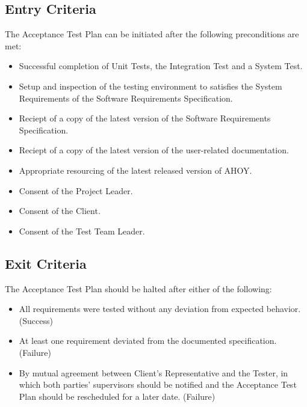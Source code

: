 \documentclass[titlepage]{article}
\begin{document}
\subsection{Entry Criteria}                                              
    The Acceptance Test Plan can be initiated after the following preconditions are met:
    \begin{itemize}
        \item Successful completion of Unit Tests, the Integration Test and a System Test.
        \item Setup and inspection of the testing environment to satisfies the System Requirements of the Software Requirements Specification.
        \item Reciept of a copy of the latest version of the Software Requirements Specification.
        \item Reciept of a copy of the latest version of the user-related documentation.
        \item Appropriate resourcing of the latest released version of AHOY.
        \item Consent of the Project Leader.
        \item Consent of the Client.
        \item Consent of the Test Team Leader.
    \end{itemize}


\subsection{Exit Criteria}
    The Acceptance Test Plan should be halted after either of the following:
    \begin{itemize}
        \item All requirements were tested without any deviation from expected behavior. (Success)
        \item At least one requirement deviated from the documented specification. (Failure)
        \item By mutual agreement between Client's Representative and the Tester, in which both parties' supervisors should be notified and the Acceptance Test Plan should be rescheduled for a later date. (Failure)
    \end{itemize}

\end{document}
